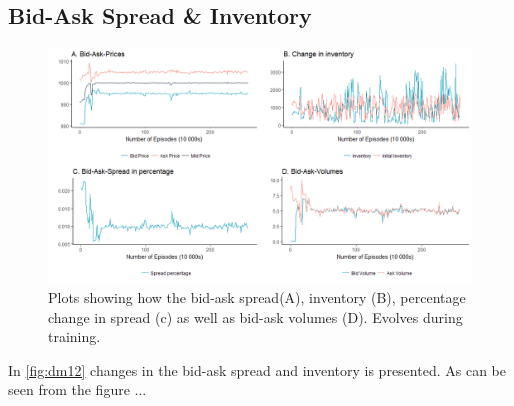 \documentclass{kththesis}
\theoremstyle{definition}
\begin{document}
\subsection*{Bid-Ask Spread \& Inventory}
\begin{figure}[H]
	    	\centering
		\includegraphics[scale=0.5]{dmv0_basp_inv_multi.png}
		\caption{Plots showing how the bid-ask spread(A), inventory (B), percentage change in spread (c) as well as bid-ask volumes (D). Evolves during training. }
		\label{fig:dm12}
\end{figure}
In \autoref{fig:dm12} changes in the bid-ask spread and inventory is presented. As can be seen from the figure ...

%		



%		
\end{document}
